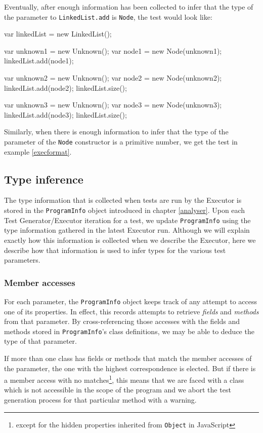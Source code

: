 Eventually, after enough information has been collected to infer that the type of the parameter to \texttt{LinkedList.add} is \texttt{Node}, the test would look like:

\begin{code}[caption=After type inference for \texttt{LinkedList.add}, label=firstinference]
   var linkedList = new LinkedList();
   
   var unknown1 = new Unknown();
   var node1 = new Node(unknown1);
   linkedList.add(node1);
   
   var unknown2 = new Unknown();
   var node2 = new Node(unknown2);
   linkedList.add(node2);
   linkedList.size();

   var unknown3 = new Unknown();
   var node3 = new Node(unknown3);
   linkedList.add(node3);
   linkedList.size();
\end{code}

Similarly, when there is enough information to infer that the type of the parameter of the \texttt{Node} constructor is a primitive number, we get the test in example \ref{execformat}.

\subsection{Type inference}
The type information that is collected when tests are run by the \textsf{Executor} is stored in the \texttt{ProgramInfo} object introduced in chapter \ref{analyser}. Upon each \textsf{Test Generator}/\textsf{Executor} iteration for a test, we update \texttt{ProgramInfo} using the type information gathered in the latest \textsf{Executor} run. Although we will explain exactly how this information is collected when we describe the \textsf{Executor}, here we describe how that information is used to infer types for the various test parameters.

\subsubsection{Member accesses}
For each parameter, the \texttt{ProgramInfo} object keeps track of any attempt to access one of its properties. In effect, this records attempts to retrieve \emph{fields} and \emph{methods} from that parameter. By cross-referencing those accesses with the fields and methods stored in \texttt{ProgramInfo}'s class definitions, we may be able to deduce the type of that parameter. 

If more than one class has fields or methods that match the member accesses of the parameter, the one with the highest correspondence is elected. But if there is a member access with no matches\footnote{except for the hidden properties inherited from \texttt{Object} in JavaScript}, this means that we are faced with a class which is not accessible in the scope of the program and we abort the test generation process for that particular method with a warning.

